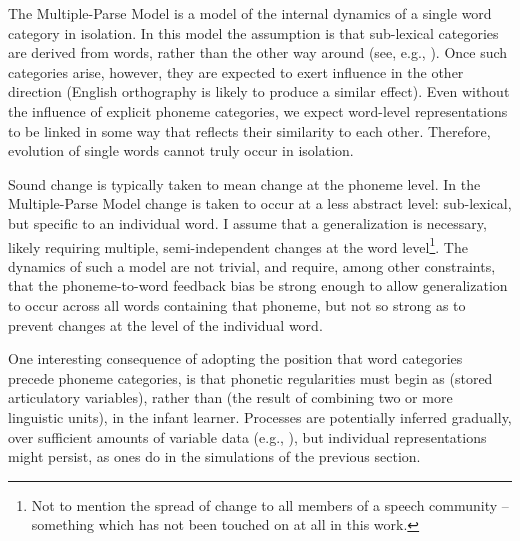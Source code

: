 The Multiple-Parse Model is a model of the internal dynamics of a
single word category in isolation. In this model the assumption is
that sub-lexical categories are derived from words, rather than the
other way around (see, e.g., \citealp{beckman2000ontogeny}). Once
such categories arise, however, they are expected to exert influence
in the other direction (English orthography is likely to produce a
similar effect). Even without the influence of explicit phoneme categories,
we expect word-level representations to be linked in some way that
reflects their similarity to each other. Therefore, evolution of single
words cannot truly occur in isolation. 

Sound change is typically taken to mean change at the phoneme level.
In the Multiple-Parse Model change is taken to occur at a less abstract
level: sub-lexical, but specific to an individual word. I assume that
a generalization is necessary, likely requiring multiple, semi-independent
changes at the word level\footnote{Not to mention the spread of change to all members of a speech community
– something which has not been touched on at all in this work.}. The dynamics of such a model are not trivial, and require, among
other constraints, that the phoneme-to-word feedback bias be strong
enough to allow generalization to occur across all words containing
that phoneme, but not so strong as to prevent changes at the level
of the individual word. 

One interesting consequence of adopting the position that word categories
precede phoneme categories, is that phonetic regularities must begin
as  (stored articulatory variables), rather than 
(the result of combining two or more linguistic units), in the infant
learner. Processes are potentially inferred gradually, over sufficient
amounts of variable data (e.g., \citealp{goodman1997inseparability}),
but individual  representations might persist, as 
ones do in the simulations of the previous section. 

